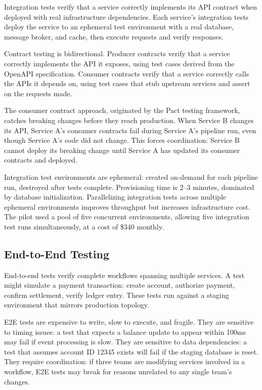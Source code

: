 Integration tests verify that a service correctly implements its API contract when deployed with real infrastructure dependencies. Each service's integration tests deploy the service to an ephemeral test environment with a real database, message broker, and cache, then execute requests and verify responses.

Contract testing is bidirectional. Producer contracts verify that a service correctly implements the API it exposes, using test cases derived from the OpenAPI specification. Consumer contracts verify that a service correctly calls the APIs it depends on, using test cases that stub upstream services and assert on the requests made.

The consumer contract approach, originated by the Pact testing framework, catches breaking changes before they reach production. When Service B changes its API, Service A's consumer contracts fail during Service A's pipeline run, even though Service A's code did not change. This forces coordination: Service B cannot deploy its breaking change until Service A has updated its consumer contracts and deployed.

Integration test environments are ephemeral: created on-demand for each pipeline run, destroyed after tests complete. Provisioning time is 2--3 minutes, dominated by database initialization. Parallelizing integration tests across multiple ephemeral environments improves throughput but increases infrastructure cost. The pilot used a pool of five concurrent environments, allowing five integration test runs simultaneously, at a cost of \$340 monthly.

\subsection{End-to-End Testing}

End-to-end tests verify complete workflows spanning multiple services. A test might simulate a payment transaction: create account, authorize payment, confirm settlement, verify ledger entry. These tests run against a staging environment that mirrors production topology.

E2E tests are expensive to write, slow to execute, and fragile. They are sensitive to timing issues: a test that expects a balance update to appear within 100ms may fail if event processing is slow. They are sensitive to data dependencies: a test that assumes account ID 12345 exists will fail if the staging database is reset. They require coordination: if three teams are modifying services involved in a workflow, E2E tests may break for reasons unrelated to any single team's changes.

